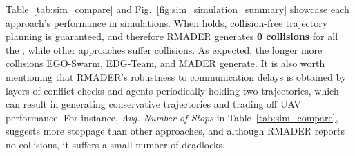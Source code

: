 Table~\ref{tab:sim_compare} and Fig.~\ref{fig:sim_simulation_summary} showcase each approach's performance in simulations. 
When \NeccessaryCond{} holds, collision-free trajectory planning is guaranteed, and therefore RMADER generates \textbf{0 collisions} for all the \delayIntroduced{}, while other approaches suffer collisions. 
As expected, the longer \delayIntroduced{} more collisions EGO-Swarm, EDG-Team, and MADER generate.
It is also worth mentioning that RMADER's robustness to communication delays is obtained by layers of conflict checks and agents periodically holding two trajectories, which can result in generating conservative trajectories and trading off UAV performance. 
For instance, \emph{Avg. Number of Stops} in Table~\ref{tab:sim_compare}, suggests more stoppage than other approaches, and although RMADER reports no collisions, it suffers a small number of deadlocks.

